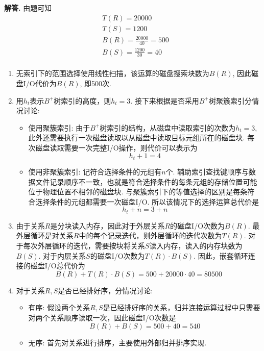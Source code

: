 \documentclass[12pt, oneside]{ctexart}
\numberwithin{figure}{section}
\numberwithin{table}{section}
\newenvironment{solution}{\par\noindent\textbf{解答. }}{\par}
\begin{document}
\begin{solution}
    由题可知
    \begin{equation*}
        \begin{aligned}
            & T(R) = 20000 \\
            & T(S) = 1200 \\
            & B(R) = \frac{20000}{40} = 500 \\
            & B(S) = \frac{1200}{30} = 40 \\
        \end{aligned}
    \end{equation*}
    \begin{enumerate}[(1)]
        \item 无索引下的范围选择使用线性扫描，该运算的磁盘搜索块数为$B(R)$, 因此磁盘I/O代价为$B(R)$, 即500次.
        \item 用$h_t$表示$B^+$树索引的高度，则$h_t = 3$. 接下来根据是否采用$B^+$树聚簇索引分情况讨论:
        \begin{itemize}
            \item 使用聚簇索引: 由于$B^+$树索引的结构，从磁盘中读取索引的次数为$h_t = 3$, 此外还需要执行一次磁盘读取以从磁盘中读取目标元组所在的磁盘块. 每次磁盘读取需要一次完整I/O操作，则代价可以表示为
                \begin{equation*}
                    h_t + 1 = 4
                \end{equation*}
            \item 使用非聚簇索引: 记符合选择条件的元组有$n$个. 辅助索引查找键顺序与数据文件记录顺序不一致，也就是符合选择条件的每条元组的存储位置可能位于物理位置不相邻的磁盘块. 与聚簇索引下的等值选择的区别是每条符合选择条件的元组都需要一次磁盘I/O. 所以该情况下的选择运算总代价是
                \begin{equation*}
                    h_t + n = 3 + n
                \end{equation*}
                \end{itemize}
        \item 由于关系$R$是分块读入内存，因此对于外层关系$R$的磁盘I/O次数为$B(R)$. 最外层循环是对关系$R$中的每个记录迭代，则外层循环的迭代次数为$T(R)$. 对于每次外层循环的迭代，需要按块将关系$S$读入内存，读入的内存块数为$B(S)$. 对于内层关系$S$的磁盘I/O次数为$T(R)\cdot B(S)$. 因此，嵌套循环连接的磁盘I/O总代价为
            \begin{equation*}
                B(R) + T(R) \cdot B(S) = 500 + 20000 \cdot 40 = 80500
            \end{equation*}
        \item 对于关系$R, S$是否已经排好序，分情况讨论:
            \begin{itemize}
                \item 有序: 假设两个关系$R, S$是已经排好序的关系，归并连接运算过程中只需要对两个关系顺序读取一次，因此磁盘I/O次数是
                    \begin{equation*}
                        B(R) + B(S) = 500 + 40 = 540
                    \end{equation*}
                \item 无序: 首先对关系进行排序，主要使用外部归并排序实现. 
                

\end{itemize}
\end{enumerate}
\end{solution}
\end{document}
